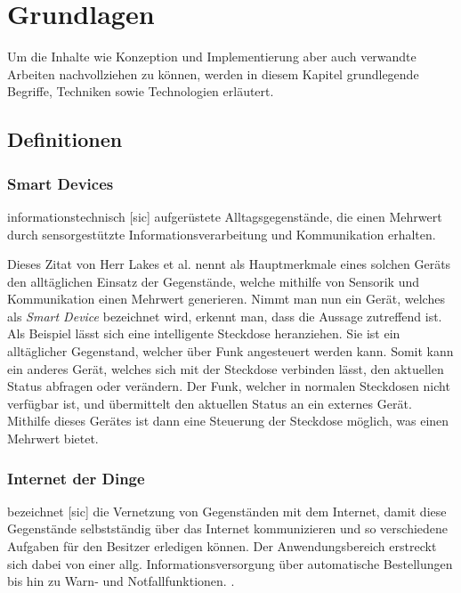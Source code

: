 \chapter{Grundlagen}
Um die Inhalte wie Konzeption und Implementierung aber auch verwandte Arbeiten nachvollziehen zu können, werden in diesem Kapitel grundlegende Begriffe, Techniken sowie Technologien erläutert.

\section{Definitionen} \label{Definitionen}
    \subsection{Smart Devices} \label{SmartDevices}
        \glqq informationstechnisch [sic] aufgerüstete Alltagsgegenstände, die einen Mehrwert durch sensorgestützte Informationsverarbeitung und Kommunikation erhalten.\grqq{} \cite{lackes_siepermann_2018}
        
        Dieses Zitat von Herr Lakes et al. nennt als Hauptmerkmale eines solchen Geräts den alltäglichen Einsatz der Gegenstände, welche mithilfe von Sensorik und Kommunikation einen Mehrwert generieren.
        Nimmt man nun ein Gerät, welches als \emph{Smart Device} bezeichnet wird, erkennt man, dass die Aussage zutreffend ist. Als Beispiel lässt sich eine intelligente Steckdose heranziehen. Sie ist ein alltäglicher Gegenstand, welcher über Funk angesteuert werden kann. Somit kann ein anderes Gerät, welches sich mit der Steckdose verbinden lässt, den aktuellen Status abfragen oder verändern.
        Der Funk, welcher in normalen Steckdosen nicht verfügbar ist, und übermittelt den aktuellen Status an ein externes Gerät. Mithilfe dieses Gerätes ist dann eine Steuerung der Steckdose möglich, was einen Mehrwert bietet.
    
    \subsection{Internet der Dinge}
        \glqq bezeichnet [sic] die Vernetzung von Gegenständen mit dem Internet, damit diese Gegenstände selbstständig über das Internet kommunizieren und so verschiedene Aufgaben für den Besitzer erledigen können. Der Anwendungsbereich erstreckt sich dabei von einer allg. Informationsversorgung über automatische Bestellungen bis hin zu Warn- und Notfallfunktionen.\grqq{}
        \cite{lackes_siepermann_2018_iot}.
    
